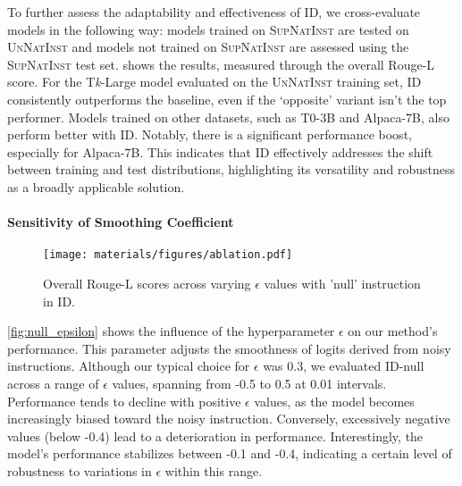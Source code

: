 To further assess the adaptability and effectiveness of ID, we cross-evaluate models in the following way: models trained on \textsc{SupNatInst} are tested on \textsc{UnNatInst} and models not trained on \textsc{SupNatInst} are assessed using the \textsc{SupNatInst} test set.  shows the results, measured through the overall Rouge-L score. For the T\textit{k}-Large model evaluated on the \textsc{UnNatInst} training set, ID consistently outperforms the baseline, even if the `opposite' variant isn't the top performer. Models trained on other datasets, such as T0-3B and Alpaca-7B, also perform better with ID. Notably, there is a significant performance boost, especially for Alpaca-7B. This indicates that ID effectively addresses the shift between training and test distributions, highlighting its versatility and robustness as a broadly applicable solution.

\vspace{-5pt}
\paragraph{Sensitivity of Smoothing Coefficient}
\begin{wrapfigure}{r}{0.33\textwidth}
\vspace{-10pt}
\centering
\texttt{[image: materials/figures/ablation.pdf]}
\vspace{-20pt}
\caption{Overall Rouge-L scores across varying $\epsilon$ values with 'null' instruction in ID.}
\vspace{-10pt}
\label{fig:null_epsilon}
\end{wrapfigure}

\autoref{fig:null_epsilon} shows the influence of the hyperparameter $\epsilon$ on our method's performance. This parameter adjusts the smoothness of logits derived from noisy instructions. Although our typical choice for $\epsilon$ was 0.3, we evaluated ID-null across a range of $\epsilon$ values, spanning from -0.5 to 0.5 at 0.01 intervals. Performance tends to decline with positive $\epsilon$ values, as the model becomes increasingly biased toward the noisy instruction. Conversely, excessively negative values (below -0.4) lead to a deterioration in performance. Interestingly, the model's performance stabilizes between -0.1 and -0.4, indicating a certain level of robustness to variations in $\epsilon$ within this range.

\vspace{-5pt}
